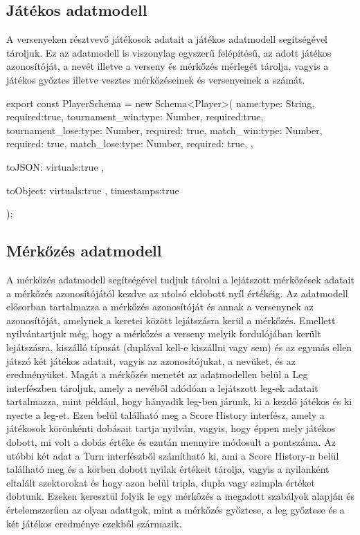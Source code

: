 \subsection{Játékos adatmodell}
A versenyeken résztvevő játékosok adatait a játékos adatmodell segítségével tároljuk. Ez az adatmodell is viszonylag egyszerű felépítésű, az adott játékos azonosítóját, a nevét illetve a verseny és mérkőzés mérlegét tárolja, vagyis a játékos győztes illetve vesztes mérkőzéseinek és versenyeinek a számát.

\begin{cpp}
export const PlayerSchema = new Schema<Player>(
    {
        name:{type: String, required:true},
        tournament_win:{type: Number, required:true},
        tournament_lose:{type: Number, required: true},
        match_win:{type: Number, required: true},
        match_lose:{type: Number, required: true},
    },{
        toJSON:{
            virtuals:true
        },

        toObject:{
            virtuals:true
        },
        timestamps:true
    }
);
\end{cpp}

\subsection{Mérkőzés adatmodell}
A mérkőzés adatmodell segítségével tudjuk tárolni a lejátszott mérkőzések adatait a mérkőzés azonosítójától kezdve az utolsó eldobott nyíl értékéig. Az adatmodell elősorban tartalmazza a mérkőzés azonosítóját és annak a versenynek az azonosítóját, amelynek a keretei között lejátszásra kerül a mérkőzés. Emellett nyilvántartjuk még, hogy a mérkőzés a verseny melyik fordulójában került lejátszásra, kiszálló típusát (duplával kell-e kiszállni vagy sem) és az egymás ellen játszó két játékos adatait, vagyis az azonosítójukat, a nevüket, és az eredményüket. Magát a mérkőzés menetét az adatmodellen belül a Leg interfészben tároljuk, amely a nevéből adódóan a lejátszott leg-ek adatait tartalmazza, mint például, hogy hányadik leg-ben járunk, ki a kezdő játékos és ki nyerte a leg-et. Ezen belül található meg a Score History interfész, amely a játékosok körönkénti dobásait tartja nyilván, vagyis, hogy éppen mely játékos dobott, mi volt a dobás értéke és ezután mennyire módosult a pontszáma. Az utóbbi két adat a Turn interfészből számítható ki, ami a Score History-n belül található meg és a körben dobott nyilak értékeit tárolja, vagyis a nyilanként eltalált szektorokat és hogy azon belül tripla, dupla vagy szimpla értéket dobtunk. Ezeken keresztül folyik le egy mérkőzés a megadott szabályok alapján és értelemszerűen az olyan adattgok, mint a mérkőzés győztese, a leg győztese és a két játékos eredménye ezekből származik.

